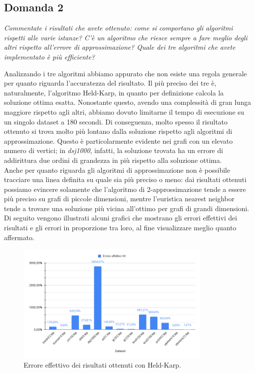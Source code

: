 \subsection{Domanda 2}
\textit{Commentate i risultati che avete ottenuto: come si comportano gli algoritmi rispetti alle varie istanze?
C'è un algoritmo che riesce sempre a fare meglio degli altri rispetto all'errore di approssimazione? Quale dei tre
algoritmi che avete implementato è più efficiente?}

Analizzando i tre algoritmi abbiamo appurato che non esiste una regola generale per quanto riguarda l'accuratezza del risultato. Il più preciso dei tre è, naturalmente, l'algoritmo Held-Karp, in quanto per definizione calcola la soluzione ottima esatta. 
Nonostante questo, avendo una complessità di gran lunga maggiore rispetto agli altri, abbiamo dovuto limitarne il tempo di esecuzione su un singolo dataset a 180 secondi. Di conseguenza, molto spesso il risultato ottenuto si trova molto più lontano dalla soluzione rispetto agli algoritmi di approssimazione.
Questo è particolarmente evidente nei grafi con un elevato numero di vertici; in \textit{dsj1000}, infatti, la soluzione trovata ha un errore di addirittura due ordini di grandezza in più rispetto alla soluzione ottima. \\
Anche per quanto riguarda gli algoritmi di approssimazione non è possibile tracciare una linea definita su quale sia più preciso o meno: dai risultati ottenuti possiamo evincere solamente che l'algoritmo di 2-approssimazione tende a essere più preciso su grafi di piccole dimensioni, mentre l'euristica nearest neighbor tende a trovare una soluzione più vicina all'ottimo per grafi di grandi dimensioni. \\
Di seguito vengono illustrati alcuni grafici che mostrano gli errori effettivi dei risultati e gli errori in proporzione tra loro, al fine visualizzare meglio quanto affermato.

\begin{figure}[H]
	\centering
	\includegraphics[width=0.85\textwidth]{res/images/errors/hk-effettivo.png}
	\caption{Errore effettivo dei risultati ottenuti con Held-Karp.}
	\label{fig:errors-hk-effettivo}
\end{figure}

